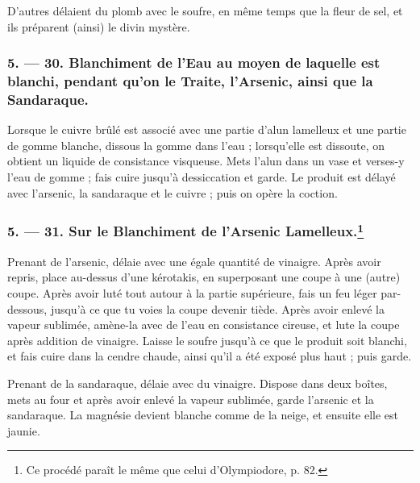 \documentclass[a4paper, 11pt, oneside, polutonikogreek, french]{article}
\begin{document}
D'autres délaient du plomb avec le soufre, en même temps que la fleur de sel, et ils préparent (ainsi) le divin mystère.

\bigskip
\centerline{\EightStarTaper}
\centerline{\EightStarTaper\EightStarTaper}
\bigskip

\subsubsection{5. --- 30. Blanchiment de l'Eau au moyen de laquelle est blanchi, pendant qu'on le Traite, l'Arsenic, ainsi que la Sandaraque.}

Lorsque le cuivre brûlé est associé avec une partie d'alun lamelleux et une partie de gomme blanche, dissous la gomme dans l'eau ; lorsqu'elle est dissoute, on obtient un liquide de consistance visqueuse. Mets l'alun dans un vase et verses-y l'eau de gomme ; fais cuire jusqu'à dessiccation et garde. Le produit est délayé avec l'arsenic, la sandaraque et le cuivre ; puis on opère la coction.

\bigskip
\centerline{\EightStarTaper}
\centerline{\EightStarTaper\EightStarTaper}
\bigskip

\subsubsection[5. --- 31. Sur le Blanchiment de l'Arsenic Lamelleux.]{5. --- 31. Sur le Blanchiment de l'Arsenic Lamelleux.\footnote{Ce procédé paraît le même que celui d'Olympiodore, p. 82.}}

Prenant de l'arsenic, délaie avec une égale quantité de vinaigre. Après avoir repris, place au-dessus d'une kérotakis, en superposant une coupe à une (autre) coupe. Après avoir luté tout autour à la partie supérieure, fais un feu léger par-dessous, jusqu'à ce que tu voies la coupe devenir tiède. Après avoir enlevé la vapeur sublimée, amène-la avec de l'eau en consistance cireuse, et lute la coupe après addition de vinaigre. Laisse le soufre jusqu'à ce que le produit soit blanchi, et fais cuire dans la cendre chaude, ainsi qu'il a été exposé plus haut ; puis garde.

Prenant de la sandaraque, délaie avec du vinaigre. Dispose dans deux boîtes, mets au four et après avoir enlevé la vapeur sublimée, garde l'arsenic et la sandaraque. La magnésie devient blanche comme de la neige, et ensuite elle est jaunie.

\bigskip
\centerline{\EightStarTaper}
\centerline{\EightStarTaper\EightStarTaper}
\bigskip
\end{document}
